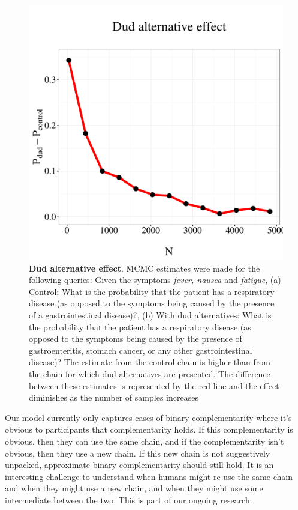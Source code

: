 \begin{figure}
\centering
\includegraphics[scale = 0.5]{figures/dud.pdf}
\caption{\textbf{Dud alternative effect}. MCMC estimates were made for the following queries: Given the symptoms \emph{fever, nausea}  and \emph{fatigue}, (a) Control: What is the probability that the patient has a respiratory disease (as opposed to the symptoms being caused by the presence of a gastrointestinal disease)?,  (b) With dud alternatives: What is the probability that the patient has a respiratory disease (as opposed to the symptoms being caused by the presence of gastroenteritis, stomach cancer, or any other gastrointestinal disease)? The estimate from the control chain is higher than from the chain for which dud alternatives are presented. The difference between these estimates is represented by the red line and the effect diminishes as the number of samples increases}
\label{fig:dud}
\end{figure}

Our model currently only captures cases of binary complementarity where it's obvious to participants that complementarity holds. If this complementarity is obvious, then they can use the same chain, and if the complementarity isn't obvious, then they use a new chain. If this new chain is not suggestively unpacked, approximate binary complementarity should still hold. It is an interesting challenge to understand when humans might re-use the same chain and when they might use a new chain, and when they might use some intermediate between the two. This is part of our ongoing research.

